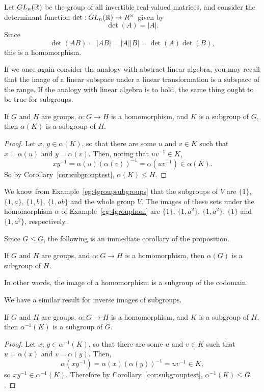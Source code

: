 \begin{example}
  Let $GL_{n}(\mathbb{R})$ be the group of all invertible real-valued 
  matrices, and consider the determinant function $\det: 
  GL_{n}(\mathbb{R}) \to R^{\times}$ given by
  \[
    \det(A) = |A|.
  \]
  Since
  \[
    \det(AB) = |AB| = |A||B| = \det(A)\det(B),
  \]
  this is a homomorphism.
\end{example}

If we once again consider the analogy with abstract linear algebra, you may
recall that the image of a linear subspace under a linear transformation is
a subspace of the range.  If the analogy with linear algebra is to hold, the
same thing ought to be true for subgroups.

\begin{proposition}\label{prop:homsubgroup}
  If $G$ and $H$ are groups, $\alpha : G \to H$ is a homomorphism, and
  $K$ is a subgroup of $G$, then $\alpha(K)$ is a subgroup of $H$.
\end{proposition}
\begin{proof}
  Let $x$, $y \in \alpha(K)$, so that there are some $u$ and $v \in K$ such
  that $x = \alpha(u)$ and $y = \alpha(v)$.  Then, noting that $uv^{-1} \in K$,
  \[
    xy^{-1} = \alpha(u)(\alpha(v))^{-1} = \alpha(uv^{-1}) \in \alpha(K).
  \]
  So by Corollary~\ref{cor:subgrouptest}, $\alpha(K) \le H$.
\end{proof}

\begin{example}
  We know from
  Example~\ref{eg:4groupsubgroups} that the subgroups of $V$ are $\{1\}$,
  $\{1,a\}$, $\{1,b\}$, $\{1, ab\}$ and the whole group $V$.  The images of
  these sets under the homomorphism $\alpha$ of Example~\ref{eg:4grouphom}
  are $\{1\}$, $\{1,a^{2}\}$, $\{1,a^{2}\}$, $\{1\}$ and $\{1, a^{2}\}$,
  respectively.
\end{example}

Since $G \le G$, the following is an immediate corollary of the proposition.

\begin{corollary}
  If $G$ and $H$ are groups, and $\alpha : G \to H$ is a homomorphism,
  then $\alpha(G)$ is a subgroup of $H$.
\end{corollary}

In other words, the image of a homomorphism is a subgroup of the codomain.

We have a similar result for inverse images of subgroups.

\begin{proposition}\label{prop:inversehomsubgroup}
  If $G$ and $H$ are groups, $\alpha : G \to H$ is a homomorphism, and
  $K$ is a subgroup of $H$, then $\alpha^{-1}(K)$ is a subgroup of
  $G$.
\end{proposition}
\begin{proof}
  Let $x$, $y \in \alpha^{-1}(K)$, so that there are some $u$ and $v \in K$ such
  that $u = \alpha(x)$ and $v = \alpha(y)$.  Then,
  \[
    \alpha(xy^{-1}) = \alpha(x)(\alpha(y))^{-1} = uv^{-1} \in K,
  \]
  so $xy^{-1} \in \alpha^{-1}(K)$.
  Therefore by Corollary~\ref{cor:subgrouptest}, $\alpha^{-1}(K) \le G$.
\end{proof}


